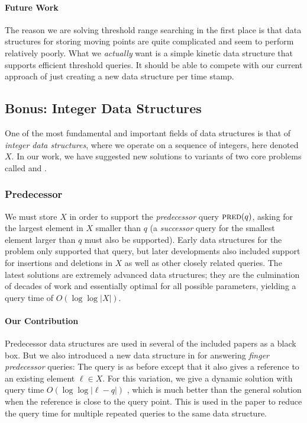 \paragraph{Future Work}
The reason we are solving threshold range searching in the first place is that data structures for storing moving points are quite complicated and seem to perform relatively poorly.
What we \emph{actually} want is a simple kinetic data structure that supports efficient threshold queries. It should be able to compete with our current approach of just creating a new data structure per time stamp.


\clearpage
\subsection{Bonus: Integer Data Structures}
One of the most fundamental and important fields of data structures is that of \emph{integer data structures}, where we operate on a sequence of integers, here denoted $X$. In our work, we have suggested new solutions to variants of two core problems called  and .


\clearpage
\subsubsection{Predecessor}
We must store $X$ in order to support the \emph{predecessor} query $\textsc{pred}(q)$, asking for the largest element in $X$ smaller than $q$ (a \emph{successor} query for the smallest element larger than $q$ must also be supported). Early data structures for the problem only supported that query, but later developments also included support for insertions and deletions in $X$ as well as other closely related queries. The latest solutions are extremely advanced data structures; they are the culmination of decades of work and essentially optimal for all possible parameters, yielding a query time of $O(\log \log |X|)$. 

\paragraph{Our Contribution} 
Predecessor data structures are used in several of the included papers as a black box. But we also introduced a new data structure in  for answering \emph{finger predecessor} queries: The query is as before except that it also gives a reference to an existing element $\ell \in X$. For this variation, we give a dynamic solution with query time $O(\log \log |\ell-q|)$ , which is much better than the general solution when the reference is close to the query point. This is used in the paper to reduce the query time for multiple repeated queries to the same data structure.

